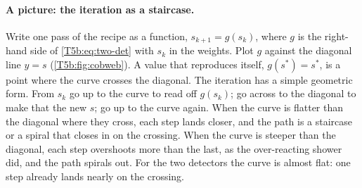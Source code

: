 \paragraph{A picture: the iteration as a staircase.}
Write one pass of the recipe as a function, $s_{k+1}=g(s_k)$, where $g$ is the
right-hand side of \eqref{T5b:eq:two-det} with $s_k$ in the weights. Plot
$g$ against the diagonal line $y=s$ (\cref{T5b:fig:cobweb}). A value that
reproduces itself, $g(s^*)=s^*$, is a point where the curve crosses the
diagonal. The iteration has a simple geometric form. From $s_k$ go up to the
curve to read off $g(s_k)$; go across to the diagonal to make that the new
$s$; go up to the curve again. When the curve is flatter than the diagonal
where they cross, each step lands closer, and the path is a staircase or a
spiral that closes in on the crossing. When the curve is steeper than the
diagonal, each step overshoots more than the last, as the over-reacting
shower did, and the path spirals out. For the two detectors the curve is
almost flat: one step already lands nearly on the crossing.

